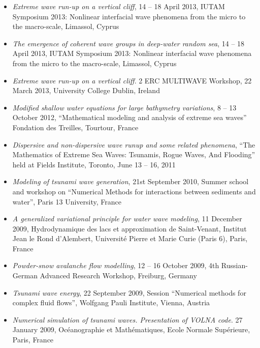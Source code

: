 \documentclass[final, a4paper, oneside, 12pt]{article}
\numberwithin{equation}{section}
\begin{document}
\begin{itemize}
  \item \textit{Extreme wave run-up on a vertical cliff}, 14 -- 18 April 2013, IUTAM Symposium 2013: Nonlinear interfacial wave phenomena from the micro to the macro-scale, Limassol, Cyprus
  
  \item \textit{The emergence of coherent wave groups in deep-water random sea}, 14 -- 18 April 2013, IUTAM Symposium 2013: Nonlinear interfacial wave phenomena from the micro to the macro-scale, Limassol, Cyprus

  \item \textit{Extreme wave run-up on a vertical cliff}. 2 ERC MULTIWAVE Workshop, 22 March 2013, University College Dublin, Ireland

  \item \textit{Modified shallow water equations for large bathymetry variations}, 8 -- 13 October 2012, ``Mathematical modeling and analysis of extreme sea waves'' Fondation des Treilles, Tourtour, France

  \item \textit{Dispersive and non-dispersive wave runup and some related phenomena}, ``The Mathematics of Extreme Sea Waves: Tsunamis, Rogue Waves, And Flooding'' held at Fields Institute, Toronto, June 13 -- 16, 2011
  
  \item \textit{Modeling of tsunami wave generation}, 21st September 2010,  Summer school and workshop on ``Numerical Methods for interactions between sediments and water'', Paris 13 University, France
  
  \item \textit{A generalized variational principle for water wave modeling}, 11 December 2009, Hydrodynamique des lacs et approximation de Saint-Venant, Institut Jean le Rond d'Alembert, Universit\'e Pierre et Marie Curie (Paris 6), Paris, France
  
  \item \textit{Powder-snow avalanche flow modelling}, 12 -- 16 October 2009, 4th Russian-German Advanced Research Workshop, Freiburg, Germany
  
  \item \textit{Tsunami wave energy}, 22 September 2009, Session ``Numerical methods for complex fluid flows'', Wolfgang Pauli Institute, Vienna, Austria
  
  \item \textit{Numerical simulation of tsunami waves. Presentation of VOLNA code}. 27 January 2009, Oc\'eanographie et Math\'ematiques, Ecole Normale Sup\'erieure, Paris, France
  

\end{itemize}
\end{document}
